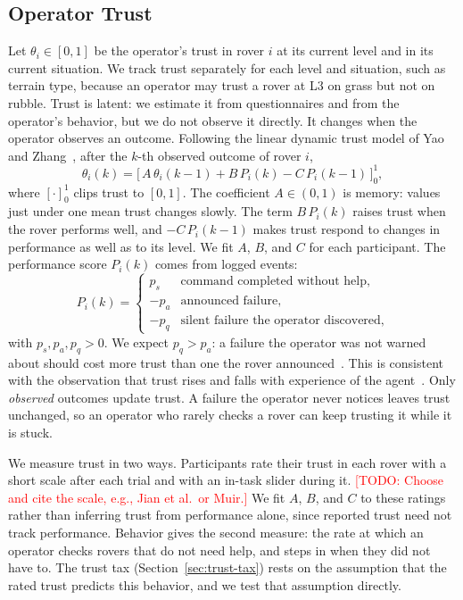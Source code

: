 \documentclass[conference]{IEEEtran}
\newcommand{\todo}[1]{\textcolor{red}{[TODO: #1]}}
\begin{document}
\subsection{Operator Trust}
\label{sec:trust}
Let $\theta_i \in [0,1]$ be the operator's trust in rover $i$ at its
current level and in its current situation. We track trust separately
for each level and situation, such as terrain type, because an
operator may trust a rover at L3 on grass but not on rubble.
Trust is latent: we estimate it from questionnaires and from the
operator's behavior, but we do not observe it directly. It changes
when the operator observes an outcome. Following the linear dynamic
trust model of Yao and Zhang~\cite{yao2020optimal}, after the $k$-th
observed outcome of rover $i$,
\begin{equation}
  \theta_i(k) = \Big[\, A\,\theta_i(k-1) + B\,P_i(k) - C\,P_i(k-1) \,\Big]_0^1 ,
  \label{eq:trust}
\end{equation}
where $[\cdot]_0^1$ clips trust to $[0,1]$. The coefficient
$A \in (0,1)$ is memory: values just under one mean trust changes
slowly. The term $B\,P_i(k)$ raises trust when the rover performs well,
and $-C\,P_i(k-1)$ makes trust respond to changes in performance as
well as to its level. We fit $A$, $B$, and $C$ for each participant.
The performance score $P_i(k)$ comes from logged events:
\begin{equation}
  P_i(k) =
  \begin{cases}
    p_s  & \text{command completed without help,}\\
    -p_a & \text{announced failure,}\\
    -p_q & \text{silent failure the operator discovered,}
  \end{cases}
  \label{eq:performance}
\end{equation}
with $p_s, p_a, p_q > 0$. We expect $p_q > p_a$: a failure the operator
was not warned about should cost more trust than one the rover
announced~\cite{lee2004trust}. This is consistent with the observation
that trust rises and falls with experience of the
agent~\cite{hoff2015trust}. Only \emph{observed} outcomes update
trust. A failure the operator never notices leaves trust unchanged,
so an operator who rarely checks a rover can keep trusting it while
it is stuck.

We measure trust in two ways. Participants rate their trust in each
rover with a short scale after each trial and with an in-task slider
during it. \todo{Choose and cite the scale, e.g., Jian et al.\ or
Muir.} We fit $A$, $B$, and $C$ to these ratings rather than inferring
trust from performance alone, since reported trust need not track
performance. Behavior gives the second measure: the rate at which an
operator checks rovers that do not need help, and steps in when they
did not have to. The trust tax (Section~\ref{sec:trust-tax}) rests on
the assumption that the rated trust predicts this behavior, and we
test that assumption directly.
\end{document}

